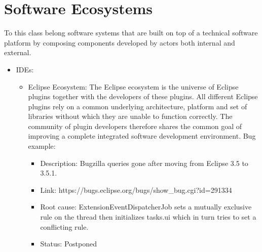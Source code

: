 \chapter{Software Ecosystems}\label{ch:softwareEcosystems}
To this class belong software systems that are built on top of a technical
software platform by composing components developed by actors both internal and
external.
                                               	
\begin{itemize}
\item IDEs: 
\begin{itemize}
  \item Eclipse Ecosystem: The Eclipse ecosystem is the universe of Eclipse
  plugins together with the developers of these plugins. All different Eclipse plugins rely on a common underlying architecture, platform and set of libraries without which they are unable to function correctly. The community of plugin developers therefore shares the common goal of improving a complete integrated software development environment. Bug example:
  \begin{itemize}
    \item Description: Bugzilla queries gone after moving from Eclipse 3.5 to
    3.5.1. 
    \item Link: https://bugs.eclipse.org/bugs/show\_bug.cgi?id=291334
    \item Root cause: ExtensionEventDispatcherJob sets a mutually exclusive rule on the
    thread then initializes tasks.ui which in turn tries to set a conflicting rule.
    \item Status: Postponed
  \end{itemize}
\end{itemize}
               

\end{itemize}
